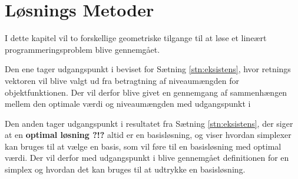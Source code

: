 \chapter{Løsnings Metoder}	
I dette kapitel vil to forskellige geometriske tilgange til at løse et lineært programmeringsproblem blive gennemgået. 

Den ene tager udgangspunkt i beviset for Sætning \ref{stn:eksistens}, hvor retnings vektoren vil blive valgt ud fra betragtning af niveaumængden for objektfunktionen. 
Der vil derfor blive givet en gennemgang af sammenhængen mellem den optimale værdi og niveaumængden med udgangspunkt i %



Den anden tager udgangspunkt i resultatet fra Sætning \ref{stn:eksistens}, der siger at en \textbf{optimal løsning ?!?} altid er en basisløsning, og viser hvordan simplexer kan bruges til at vælge en basis, som vil føre til en basisløsning med optimal værdi.
Der vil derfor med udgangspunkt i %
blive gennemgået definitionen for en simplex og hvordan det kan bruges til at udtrykke en basisløsning.




